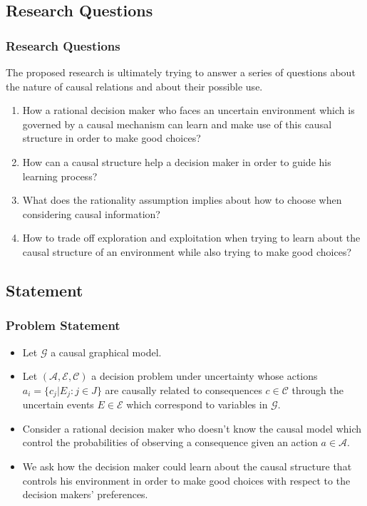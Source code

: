 \documentclass{beamer}
\theoremstyle{plain}
\begin{document}
	\subsection{Research Questions}
	\begin{frame}
	\frametitle{Research Questions}
	The proposed research is ultimately trying to answer a series of questions about the nature of causal relations and about their possible use.
	\begin{enumerate}
	\item How a rational decision maker who faces an uncertain environment which is governed by a causal mechanism can learn and make use of this causal structure in order to make good    	choices? 
	\item How can a causal structure help a decision maker in order to guide his learning process? 
	\item What does the rationality assumption implies about how to choose when considering causal information? 
\item How to trade off exploration and exploitation when trying to learn about the causal structure of an environment while also trying to make good choices?
\end{enumerate}
\end{frame}
	\subsection{Statement}
	\begin{frame}
	\frametitle{Problem Statement}
	\begin{itemize}
	\item Let  $\mathcal{G}$ a causal graphical model.
	\item Let $(\mathcal{A},\mathcal{E},\mathcal{C})$ a decision problem under uncertainty whose actions $a_i = \{ c_j | E_j : j \in J \}$  are causally related to consequences $c \in \mathcal{C}$ through the uncertain events $E \in \mathcal{E}$ which correspond to variables in $\mathcal{G}$. 
	\item Consider a rational decision maker who doesn't know the causal model which control the probabilities of observing a consequence given an action $a \in \mathcal{A}$.
	\item We ask how the decision maker could learn about the causal structure that controls his environment in order to make good choices with respect to the decision makers' preferences.
	\end{itemize}
	\end{frame}
\end{document}

